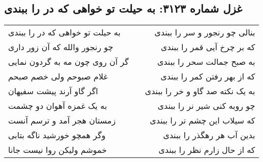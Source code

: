 \begin{center}
\section*{غزل شماره ۳۱۲۳: به حیلت تو خواهی که در را ببندی}
\label{sec:3123}
\begin{longtable}{l p{0.5cm} r}
به حیلت تو خواهی که در را ببندی
&&
بنالی چو رنجور و سر را ببندی
\\
چو رنجور والله که آن زور داری
&&
که بر چرخ آیی قمر را ببندی
\\
گر آن روی چون مه به گردون نمایی
&&
به صبح جمالت سحر را ببندی
\\
غلام صبوحم ولی خصم صبحم
&&
که از بهر رفتن کمر را ببندی
\\
اگر گاو آرند پیشت سفیهان
&&
به یک نکته صد گاو و خر را ببندی
\\
به یک غمزه آهوان دو چشمت
&&
چو روبه کنی شیر نر را ببندی
\\
زمستان هجر آمد و ترسم آنست
&&
که سیلاب این چشم تر را ببندی
\\
وگر همچو خورشید ناگه بتابی
&&
بدین آب هر رهگذر را ببندی
\\
خموشم ولیکن روا نیست جانا
&&
که از حال زارم نظر را ببندی
\\
\end{longtable}
\end{center}
